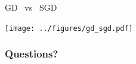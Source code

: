 \documentclass{beamer}
\begin{document}
\begin{frame}[t]{GD \ vs \ SGD}
	\grid

	\hspace*{-0.7cm}
	\texttt{[image: ../figures/gd\_sgd.pdf]}

\end{frame}

\appendix
\backupbegin
\begin{frame}[t]
	\frametitle{Questions?}
	\grid

	\pause
\end{frame}
\backupend
\end{document}
